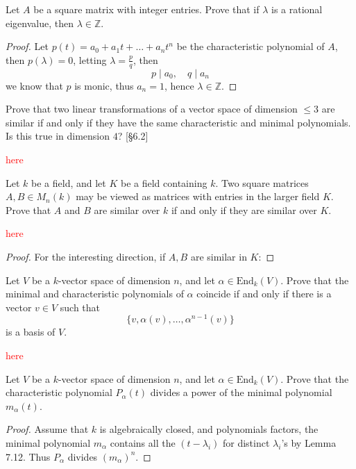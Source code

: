 \documentclass[openany]{book}
\newcommand{\Z}{\mathbb{Z}}
\begin{document}
\begin{prob}[6.13]
    Let $A$ be a square matrix with integer entries. Prove that if $\lambda$ is a rational eigenvalue, then $\lambda\in\mathbb{Z}$.
\end{prob}

\begin{proof}
    Let $p(t)=a_0+a_1t+\dots+a_nt^n$ be the characteristic polynomial of $A$, then $p(\lambda)=0$, letting $\lambda=\frac{p}{q}$, then 
    \begin{equation*}
        p\mid a_0,\quad q\mid a_n
    \end{equation*}
    we know that $p$ is monic, thus $a_n=1$, hence $\lambda\in\Z$.
\end{proof}

\begin{prob}[7.3]
    Prove that two linear transformations of a vector space of dimension \(\leq 3\) are similar if and only if they have the same characteristic and minimal polynomials. Is this true in dimension \(4\)? [§6.2]
\end{prob}
\textcolor{red}{here}

\begin{prob}[7.4]
    Let \(k\) be a field, and let \(K\) be a field containing \(k\). Two square matrices \(A, B \in M_n(k)\) may be viewed as matrices with entries in the larger field \(K\). Prove that \(A\) and \(B\) are similar over \(k\) if and only if they are similar over \(K\).
\end{prob}
\textcolor{red}{here}
\begin{proof}
    For the interesting direction, if $A,B$ are similar in $K$: 
\end{proof}

\begin{prob}[7.7]
    Let \( V \) be a \( k \)-vector space of dimension \( n \), and let \( \alpha \in \text{End}_k(V) \). Prove that the minimal and characteristic polynomials of \( \alpha \) coincide if and only if there is a vector \( v \in V \) such that  
    \[ \{v, \alpha(v), \dots, \alpha^{n-1}(v)\} \] 
is a basis of \( V \).
\end{prob}
\textcolor{red}{here}



\begin{prob}[7.8]
    Let \( V \) be a \( k \)-vector space of dimension \( n \), and let \( \alpha \in \text{End}_k(V) \). Prove that the characteristic polynomial \( P_\alpha(t) \) divides a power of the minimal polynomial \( m_\alpha(t) \).
\end{prob}
\begin{proof}
    Assume that $k$ is algebraically closed, and polynomials factors, the minimal polynomial $m_\alpha$ contains all the $(t-\lambda_i)$ for distinct $\lambda_i$'s by Lemma 7.12. Thus $P_\alpha$ divides $(m_\alpha)^n$.
\end{proof}
\end{document}
